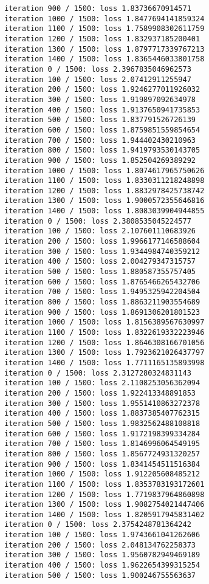 \documentclass[11pt]{article}
\begin{document}
\begin{Verbatim}[commandchars=\\\{\}]
iteration 900 / 1500: loss 1.83736670914571
iteration 1000 / 1500: loss 1.8477694141859324
iteration 1100 / 1500: loss 1.7589908302611759
iteration 1200 / 1500: loss 1.832937185200401
iteration 1300 / 1500: loss 1.8797717339767213
iteration 1400 / 1500: loss 1.8365446033801758
iteration 0 / 1500: loss 2.3967835046962573
iteration 100 / 1500: loss 2.07412911255947
iteration 200 / 1500: loss 1.9246277011926032
iteration 300 / 1500: loss 1.919897092634978
iteration 400 / 1500: loss 1.9137650941735853
iteration 500 / 1500: loss 1.837791526726139
iteration 600 / 1500: loss 1.8759851559854654
iteration 700 / 1500: loss 1.944402430210963
iteration 800 / 1500: loss 1.9419793530143705
iteration 900 / 1500: loss 1.852504269389292
iteration 1000 / 1500: loss 1.8074617965750626
iteration 1100 / 1500: loss 1.8330311218248898
iteration 1200 / 1500: loss 1.8832978425738742
iteration 1300 / 1500: loss 1.9000572355646816
iteration 1400 / 1500: loss 1.8083039904944855
iteration 0 / 1500: loss 2.3808535045224577
iteration 100 / 1500: loss 2.107601110683926
iteration 200 / 1500: loss 1.9966177146588604
iteration 300 / 1500: loss 1.9344984740359212
iteration 400 / 1500: loss 2.004279347315757
iteration 500 / 1500: loss 1.880587355757405
iteration 600 / 1500: loss 1.8765466265432706
iteration 700 / 1500: loss 1.9495325942204504
iteration 800 / 1500: loss 1.8863211903554689
iteration 900 / 1500: loss 1.8691306201801523
iteration 1000 / 1500: loss 1.8156389567630997
iteration 1100 / 1500: loss 1.8322619332223946
iteration 1200 / 1500: loss 1.8646308166701056
iteration 1300 / 1500: loss 1.7923621026437797
iteration 1400 / 1500: loss 1.7711165135893998
iteration 0 / 1500: loss 2.3127280324831143
iteration 100 / 1500: loss 2.1108253056362094
iteration 200 / 1500: loss 1.922413348891853
iteration 300 / 1500: loss 1.9551410863272378
iteration 400 / 1500: loss 1.8837385407762315
iteration 500 / 1500: loss 1.9832562488108818
iteration 600 / 1500: loss 1.9172198399334284
iteration 700 / 1500: loss 1.8146996064549195
iteration 800 / 1500: loss 1.8567724931320257
iteration 900 / 1500: loss 1.8341454511516384
iteration 1000 / 1500: loss 1.912205608485212
iteration 1100 / 1500: loss 1.8353783193172601
iteration 1200 / 1500: loss 1.7719837964860898
iteration 1300 / 1500: loss 1.9082754021447406
iteration 1400 / 1500: loss 1.8205917945831402
iteration 0 / 1500: loss 2.3754248781364242
iteration 100 / 1500: loss 1.9743661041262606
iteration 200 / 1500: loss 2.048134762258373
iteration 300 / 1500: loss 1.9560782949469189
iteration 400 / 1500: loss 1.9622654399315254
iteration 500 / 1500: loss 1.900246755563637

\end{Verbatim}
\end{document}
